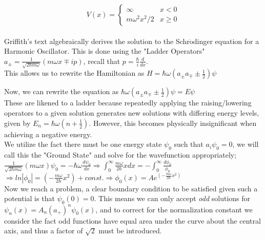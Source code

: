 \documentclass[12pt]{article}
\begin{document}
\[V(x)=
\begin{cases}
\infty & x<0 \\
m\omega^2x^2/2 & x\geq0
\end{cases}
\]\\

Griffith's text algebraically derives the solution to the Schr$\ddot{\text{o}}$dinger equation for a Harmonic Oscillator. This is done using the "Ladder Operators" $a_{\pm}=\frac{1}{\sqrt{2\hbar m\omega}}(m\omega x\mp ip)$, recall that $p=\frac{\hbar}{i}\frac{d}{dx}$.\\

This allows us to rewrite the Hamiltonian as $H=\hbar\omega(a_\pm a_\mp\pm\frac{1}{2})\psi$

Now, we can rewrite the equation as $\hbar\omega(a_\pm a_\mp\pm\frac{1}{2})\psi=E\psi$\\

These are likened to a ladder because repeatedly applying the raising/lowering operators to a given solution generates new solutions with differing energy levels, given by $E_n=\hbar\omega(n+\frac{1}{2})$. However, this becomes physically insignificant when achieving a negative energy.\\

We utilize the fact there must be one energy state $\psi_0$ such that $a_i\psi_0=0$, we will call this the "Ground State" and solve for the wavefunction appropriately;\\

$\frac{1}{\sqrt{2\hbar m\omega}}(m\omega x)\psi_0=-\hbar\omega\frac{d\psi_0}{dx}\Longrightarrow{\displaystyle\int_0^\infty}\frac{m\omega}{2\hbar}xdx=-{\displaystyle\int_0^\infty}\frac{d\phi_0}{\phi_0}$\\

$\Rightarrow ln|\phi_0|=(-\frac{m\omega}{2\hbar}x^2)+const.\Rightarrow\phi_0(x)=A e^{(-\frac{m\omega}{2\hbar}x^2)}$\\

Now we reach a problem, a clear boundary condition to be satisfied given such a potential is that $\psi_0(0)=0$. This means we can only accept \textit{odd} solutions for $\psi_n(x)=A_n(a_+)^n\psi_0(x)$, and to correct for the normalization constant we consider the fact odd functions have equal area under the curve about the central axis, and thus a factor of $\sqrt{2}$ must be introduced.\\
\end{document}
